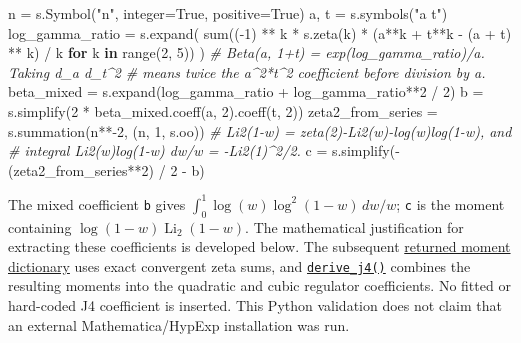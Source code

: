 \documentclass[
  11pt,
]{article}
\newenvironment{Shaded}{}{}
\newcommand{\BuiltInTok}[1]{\textcolor[rgb]{0.00,0.50,0.00}{#1}}
\newcommand{\CommentTok}[1]{\textcolor[rgb]{0.38,0.63,0.69}{\textit{#1}}}
\newcommand{\ControlFlowTok}[1]{\textcolor[rgb]{0.00,0.44,0.13}{\textbf{#1}}}
\newcommand{\DecValTok}[1]{\textcolor[rgb]{0.25,0.63,0.44}{#1}}
\newcommand{\KeywordTok}[1]{\textcolor[rgb]{0.00,0.44,0.13}{\textbf{#1}}}
\newcommand{\NormalTok}[1]{#1}
\newcommand{\OperatorTok}[1]{\textcolor[rgb]{0.40,0.40,0.40}{#1}}
\newcommand{\StringTok}[1]{\textcolor[rgb]{0.25,0.44,0.63}{#1}}
\newcommand{\VariableTok}[1]{\textcolor[rgb]{0.10,0.09,0.49}{#1}}
\begin{document}
\begin{Shaded}
\begin{Highlighting}[]
\NormalTok{n }\OperatorTok{=}\NormalTok{ s.Symbol(}\StringTok{"n"}\NormalTok{, integer}\OperatorTok{=}\VariableTok{True}\NormalTok{, positive}\OperatorTok{=}\VariableTok{True}\NormalTok{)}
\NormalTok{a, t }\OperatorTok{=}\NormalTok{ s.symbols(}\StringTok{"a t"}\NormalTok{)}
\NormalTok{log\_gamma\_ratio }\OperatorTok{=}\NormalTok{ s.expand(}
    \BuiltInTok{sum}\NormalTok{((}\OperatorTok{{-}}\DecValTok{1}\NormalTok{) }\OperatorTok{**}\NormalTok{ k }\OperatorTok{*}\NormalTok{ s.zeta(k) }\OperatorTok{*}\NormalTok{ (a}\OperatorTok{**}\NormalTok{k }\OperatorTok{+}\NormalTok{ t}\OperatorTok{**}\NormalTok{k }\OperatorTok{{-}}\NormalTok{ (a }\OperatorTok{+}\NormalTok{ t) }\OperatorTok{**}\NormalTok{ k) }\OperatorTok{/}\NormalTok{ k }\ControlFlowTok{for}\NormalTok{ k }\KeywordTok{in} \BuiltInTok{range}\NormalTok{(}\DecValTok{2}\NormalTok{, }\DecValTok{5}\NormalTok{))}
\NormalTok{)}
\CommentTok{\# Beta(a, 1+t) = exp(log\_gamma\_ratio)/a. Taking d\_a d\_t\^{}2}
\CommentTok{\# means twice the a\^{}2*t\^{}2 coefficient before division by a.}
\NormalTok{beta\_mixed }\OperatorTok{=}\NormalTok{ s.expand(log\_gamma\_ratio }\OperatorTok{+}\NormalTok{ log\_gamma\_ratio}\OperatorTok{**}\DecValTok{2} \OperatorTok{/} \DecValTok{2}\NormalTok{)}
\NormalTok{b }\OperatorTok{=}\NormalTok{ s.simplify(}\DecValTok{2} \OperatorTok{*}\NormalTok{ beta\_mixed.coeff(a, }\DecValTok{2}\NormalTok{).coeff(t, }\DecValTok{2}\NormalTok{))}
\NormalTok{zeta2\_from\_series }\OperatorTok{=}\NormalTok{ s.summation(n}\OperatorTok{**{-}}\DecValTok{2}\NormalTok{, (n, }\DecValTok{1}\NormalTok{, s.oo))}
\CommentTok{\# Li2(1{-}w) = zeta(2){-}Li2(w){-}log(w)log(1{-}w), and}
\CommentTok{\# integral Li2(w)log(1{-}w) dw/w = {-}Li2(1)\^{}2/2.}
\NormalTok{c }\OperatorTok{=}\NormalTok{ s.simplify(}\OperatorTok{{-}}\NormalTok{(zeta2\_from\_series}\OperatorTok{**}\DecValTok{2}\NormalTok{) }\OperatorTok{/} \DecValTok{2} \OperatorTok{{-}}\NormalTok{ b)}
\end{Highlighting}
\end{Shaded}

The mixed coefficient \texttt{b} gives
\(\int_0^1 \log(w)\log^2(1-w)\,dw/w\); \texttt{c} is the moment
containing \(\log(1-w)\operatorname{Li}_2(1-w)\). The mathematical
justification for extracting these coefficients is developed below. The
subsequent
\href{https://github.com/lalmei/hypra/blob/4b2904aa1163f9e47f2f497cd0b9a9be5c719b59/scripts/validate_integral.py\#L39-L45}{returned
moment dictionary} uses exact convergent zeta sums, and
\href{https://github.com/lalmei/hypra/blob/4b2904aa1163f9e47f2f497cd0b9a9be5c719b59/scripts/validate_integral.py\#L48-L89}{\texttt{derive\_j4()}}
combines the resulting moments into the quadratic and cubic regulator
coefficients. No fitted or hard-coded J4 coefficient is inserted. This
Python validation does not claim that an external Mathematica/HypExp
installation was run.
\end{document}
